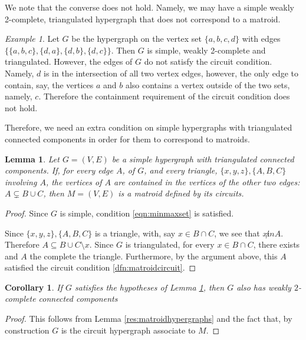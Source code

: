 \documentclass[11pt]{article}
\newtheorem{lem}[thm]{Lemma}
\newtheorem{cor}[thm]{Corollary}
\theoremstyle{remark}
\newtheorem{eg}[thm]{Example}
\theoremstyle{definition}
\begin{document}
We note that the converse does not hold. Namely, we may have a simple weakly 2-complete, triangulated hypergraph that does not correspond to a matroid. 

\begin{eg}\label{eg:2completetriangulatednotmatroid}
	Let $G$ be the hypergraph on the vertex set $\{a, b, c, d\}$ with edges $\{\{a, b, c\}, \{d, a\}, \{d, b\}, \{d, c\}\}$. Then $G$ is simple, weakly 2-complete and triangulated. However, the edges of $G$ do not satisfy the circuit condition. Namely, $d$ is in the intersection of all two vertex edges, however, the only edge to contain, say, the vertices $a$ and $b$ also contains a vertex outside of the two sets, namely, $c$. Therefore the containment requirement of the circuit condition does not hold. 
\end{eg}

Therefore, we need an extra condition on simple hypergraphs with triangulated connected components in order for them to correspond to matroids. 

\begin{lem}\label{res:somehypergraphsmatroids} 
    Let $G = (V, E)$ be a simple hypergraph with triangulated connected components. If, for every edge $A$, of $G$, and every triangle, $\{x, y, z\}, \{A, B, C\}$ involving $A$, the vertices of $A$ are contained in the vertices of the other two edges: $A \subsetneq B\cup C$, then $M = (V,E)$ is a matroid defined by its circuits. 
\end{lem}

\begin{proof}
Since $G$ is simple, condition \eqref{eqn:minmaxset} is satisfied. 

Since $\{x, y, z\}, \{A, B, C\}$ is a triangle, with, say $x \in B \cap C$, we see that $x \not in A$. Therefore $A \subseteq B \cup C \setminus x$. Since $G$ is triangulated, for every $x \in B \cap C$, there exists and $A$ the complete the triangle. Furthermore, by the argument above, this $A$ satisfied the circuit condition \eqref{dfn:matroidcircuit}.  
\end{proof}

\begin{cor}
	If $G$ satisfies the hypotheses of Lemma \ref{res:somehypergraphsmatroids}, then $G$ also has weakly $2$-complete connected components
\end{cor}

\begin{proof}
	This follows from Lemma \ref{res:matroidhypergraphs} and the fact that, by construction $G$ is the circuit hypergraph associate to $M$. 
\end{proof}
\end{document}
